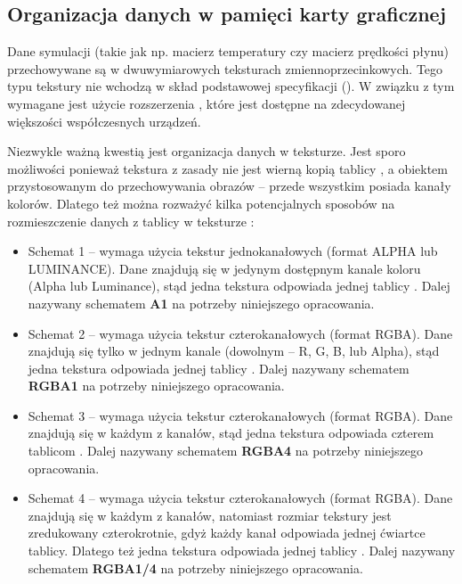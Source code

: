 \subsection{Organizacja danych w pamięci karty graficznej}
\label{sec:orgDanychWGPU}
Dane symulacji (takie jak np. macierz temperatury czy macierz prędkości płynu)
przechowywane są w dwuwymiarowych teksturach zmiennoprzecinkowych. Tego typu
tekstury nie wchodzą w skład podstawowej specyfikacji 
(\cite{WebGLSpec}). W związku z tym wymagane jest użycie rozszerzenia
, które jest dostępne na zdecydowanej większości
współczesnych urządzeń.

Niezwykle ważną kwestią jest organizacja danych w teksturze. Jest sporo
możliwości ponieważ tekstura z zasady nie jest wierną kopią tablicy
\js, a obiektem przystosowanym do przechowywania obrazów -- przede
wszystkim posiada kanały kolorów. Dlatego też można rozważyć kilka
potencjalnych sposobów na rozmieszczenie danych z tablicy \js w teksturze
:

\begin{itemize}

\item Schemat 1 -- wymaga użycia tekstur jednokanałowych (format ALPHA lub
LUMINANCE). Dane znajdują się w jedynym dostępnym kanale koloru (Alpha lub
Luminance), stąd jedna tekstura odpowiada jednej tablicy \js. Dalej nazywany
schematem \textbf{A1} na potrzeby niniejszego opracowania.

\item Schemat 2 -- wymaga użycia tekstur czterokanałowych (format RGBA). Dane
znajdują się tylko w jednym kanale (dowolnym -- R, G, B, lub Alpha), stąd
jedna tekstura odpowiada jednej tablicy \js. Dalej nazywany schematem
\textbf{RGBA1} na potrzeby niniejszego opracowania.

\item Schemat 3 -- wymaga użycia tekstur czterokanałowych (format RGBA). Dane
znajdują się w każdym z kanałów, stąd jedna tekstura odpowiada czterem
tablicom \js. Dalej nazywany schematem \textbf{RGBA4} na potrzeby niniejszego
opracowania.

\item Schemat 4 -- wymaga użycia tekstur czterokanałowych (format RGBA). Dane
znajdują się w każdym z kanałów, natomiast rozmiar tekstury jest zredukowany
czterokrotnie, gdyż każdy kanał odpowiada jednej ćwiartce tablicy. Dlatego też
jedna tekstura odpowiada jednej tablicy \js. Dalej nazywany schematem
\textbf{RGBA1/4} na potrzeby niniejszego opracowania.

\end{itemize}

